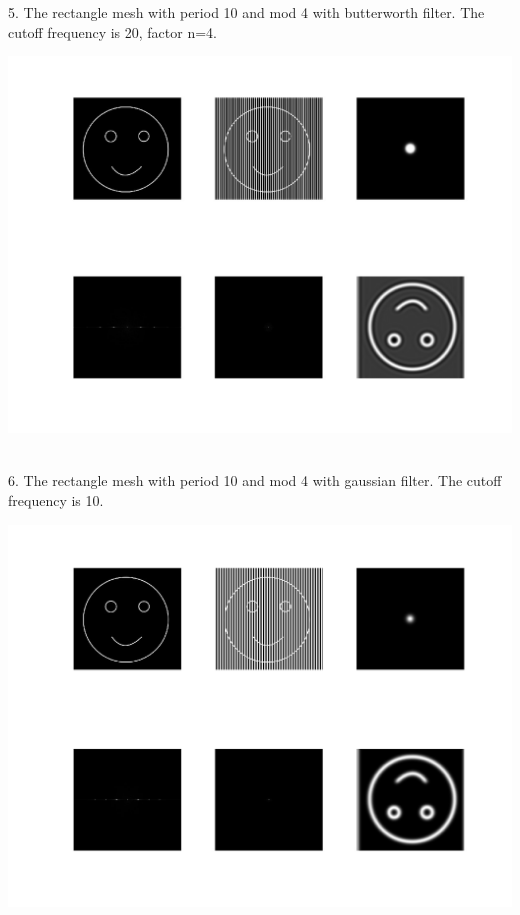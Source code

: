 \documentclass[a4paper]{article}
\begin{document}
5. The rectangle mesh with period 10 and mod 4 with butterworth filter. The cutoff frequency is 20, factor n=4.\\
\centerline{\includegraphics[scale=0.30]{5.jpg}}\\
6. The rectangle mesh with period 10 and mod 4 with gaussian filter. The cutoff frequency is 10.\\
\centerline{\includegraphics[scale=0.30]{6.jpg}}
\clearpage
\end{document}
